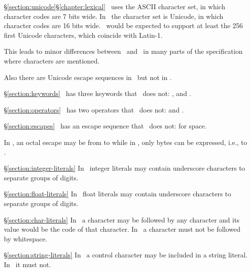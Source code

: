 \begin{Lentry}
\item[\ifStd\S\ref{section:unicode}\fi\ifOld\S\ref{chapter:lexical}\fi]
\OldErlang\ uses the ASCII character set, in which character codes are 7 bits wide.
In \StdErlang\ the character set is Unicode, in which character codes are 16 bits wide.
\NewErlang\
would be expected to support at least the 256 first Unicode characters, which coincide with
Latin-1.

This leads to minor differences between \OldErlang\ and \StdErlang\
in many parts of the specification where characters are mentioned.

Also there are Unicode escape sequences in \StdErlang\ but not in \OldErlang.

\item[\S\ref{section:keywords}]
\StdErlang\ has three keywords that \OldErlang\ does not: , 
and \T{try}.

\item[\S\ref{section:operators}]
\StdErlang\ has two operators that \OldErlang\ does not: \T{//} and .

\item[\S\ref{section:escapes}]
\StdErlang\ has an escape sequence that \OldErlang\ does not:  for space.

In \OldErlang, an octal escape may be from  to \T{\char`\\777}
while in \StdErlang, only bytes can be expressed, i.e.,
\T{\char`\\000} to \T{\char`\\377}.

\item[\S\ref{section:integer-literals}]
In \StdErlang\ integer literals may contain underscore characters to separate groups of digits.

\item[\S\ref{section:float-literals}]
In \StdErlang\ float literals may contain underscore characters to separate groups of digits.

\item[\S\ref{section:char-literals}]
In \OldErlang\ a  character may be followed by any character and its value would be
the code of that character.  In \StdErlang\ a  character must not be followed by
whitespace.

\item[\S\ref{section:string-literals}]
In \OldErlang\ a control character may be included in a string literal.
In \StdErlang\ it must not.


\end{Lentry}
